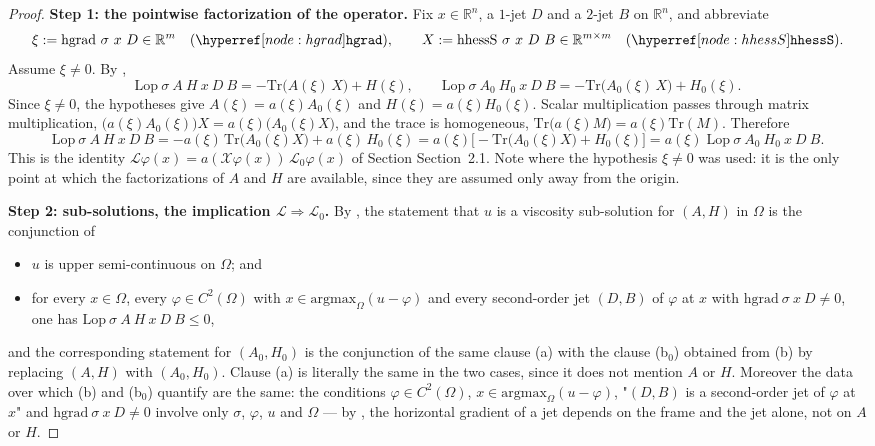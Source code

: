 \begin{proof}
\noindent\textbf{Step 1: the pointwise factorization of the operator.} Fix
$x\in\mathbb R^{n}$, a $1$-jet $D$ and a $2$-jet $B$ on $\mathbb R^{n}$, and abbreviate
\[
 \xi:=\mathrm{hgrad}\ \sigma\ x\ D\in\mathbb R^{m}\quad(\noderef{hgrad}),
 \qquad
 X:=\mathrm{hhessS}\ \sigma\ x\ D\ B\in\mathbb R^{m\times m}\quad(\noderef{hhessS}).
\]
Assume $\xi\ne0$. By ,
\[
 \mathrm{Lop}\ \sigma\ A\ H\ x\ D\ B=-\mathrm{Tr}\big(A(\xi)\,X\big)+H(\xi),
 \qquad
 \mathrm{Lop}\ \sigma\ A_0\ H_0\ x\ D\ B=-\mathrm{Tr}\big(A_0(\xi)\,X\big)+H_0(\xi).
\]
Since $\xi\ne0$, the hypotheses give $A(\xi)=a(\xi)A_0(\xi)$ and $H(\xi)=a(\xi)H_0(\xi)$.
Scalar multiplication passes through matrix multiplication,
$\big(a(\xi)A_0(\xi)\big)X=a(\xi)\big(A_0(\xi)X\big)$, and the trace is homogeneous,
$\mathrm{Tr}\big(a(\xi)M\big)=a(\xi)\mathrm{Tr}(M)$. Therefore
\[
 \mathrm{Lop}\ \sigma\ A\ H\ x\ D\ B
  =-a(\xi)\,\mathrm{Tr}\big(A_0(\xi)X\big)+a(\xi)\,H_0(\xi)
  =a(\xi)\Big[-\mathrm{Tr}\big(A_0(\xi)X\big)+H_0(\xi)\Big]
  =a(\xi)\;\mathrm{Lop}\ \sigma\ A_0\ H_0\ x\ D\ B . \tag{1}
\]
This is the identity $\mathcal L\varphi(x)=a(\mathcal X\varphi(x))\,\mathcal L_0\varphi(x)$
of Section Section~2.1. Note where the hypothesis $\xi\ne0$ was used: it is the only point at
which the factorizations of $A$ and $H$ are available, since they are assumed only away from
the origin.

\medskip\noindent\textbf{Step 2: sub-solutions, the implication
$\mathcal L\Rightarrow\mathcal L_0$.} By , the statement that $u$ is a
viscosity sub-solution for $(A,H)$ in $\Omega$ is the conjunction of
\begin{itemize}
\item[(a)] $u$ is upper semi-continuous on $\Omega$; and
\item[(b)] for every $x\in\Omega$, every $\varphi\in C^{2}(\Omega)$ with
  $x\in\mathrm{argmax}_\Omega(u-\varphi)$ and every second-order jet $(D,B)$ of $\varphi$ at
  $x$ with $\mathrm{hgrad}\ \sigma\ x\ D\ne0$, one has
  $\mathrm{Lop}\ \sigma\ A\ H\ x\ D\ B\le0$,
\end{itemize}
and the corresponding statement for $(A_0,H_0)$ is the conjunction of the same clause (a)
with the clause (b$_0$) obtained from (b) by replacing $(A,H)$ with $(A_0,H_0)$. Clause (a)
is literally the same in the two cases, since it does not mention $A$ or $H$. Moreover the
data over which (b) and (b$_0$) quantify are the same: the conditions
$\varphi\in C^{2}(\Omega)$, $x\in\mathrm{argmax}_\Omega(u-\varphi)$, "$(D,B)$ is a
second-order jet of $\varphi$ at $x$" and $\mathrm{hgrad}\ \sigma\ x\ D\ne0$ involve only
$\sigma$, $\varphi$, $u$ and $\Omega$ — by , the horizontal gradient of a jet
depends on the frame and the jet alone, not on $A$ or $H$.


\end{proof}
